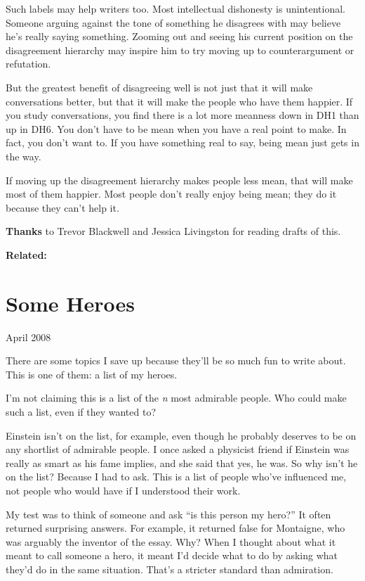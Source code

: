 \documentclass[12pt]{book}
\begin{document}
Such labels may help writers too. Most intellectual dishonesty is
unintentional. Someone arguing against the tone of something he
disagrees with may believe he's really saying something. Zooming out and
seeing his current position on the disagreement hierarchy may inspire
him to try moving up to counterargument or refutation.

But the greatest benefit of disagreeing well is not just that it will
make conversations better, but that it will make the people who have
them happier. If you study conversations, you find there is a lot more
meanness down in DH1 than up in DH6. You don't have to be mean when you
have a real point to make. In fact, you don't want to. If you have
something real to say, being mean just gets in the way.

If moving up the disagreement hierarchy makes people less mean, that
will make most of them happier. Most people don't really enjoy being
mean; they do it because they can't help it.

\textbf{Thanks} to Trevor Blackwell and Jessica Livingston for reading
drafts of this.

\textbf{Related:}
\chapter{Some Heroes}

April 2008

There are some topics I save up because they'll be so much fun to write
about. This is one of them: a list of my heroes.

I'm not claiming this is a list of the \emph{n} most admirable people.
Who could make such a list, even if they wanted to?

Einstein isn't on the list, for example, even though he probably
deserves to be on any shortlist of admirable people. I once asked a
physicist friend if Einstein was really as smart as his fame implies,
and she said that yes, he was. So why isn't he on the list? Because I
had to ask. This is a list of people who've influenced me, not people
who would have if I understood their work.

My test was to think of someone and ask ``is this person my hero?'' It
often returned surprising answers. For example, it returned false for
Montaigne, who was arguably the inventor of the essay. Why? When I
thought about what it meant to call someone a hero, it meant I'd decide
what to do by asking what they'd do in the same situation. That's a
stricter standard than admiration.
\end{document}
